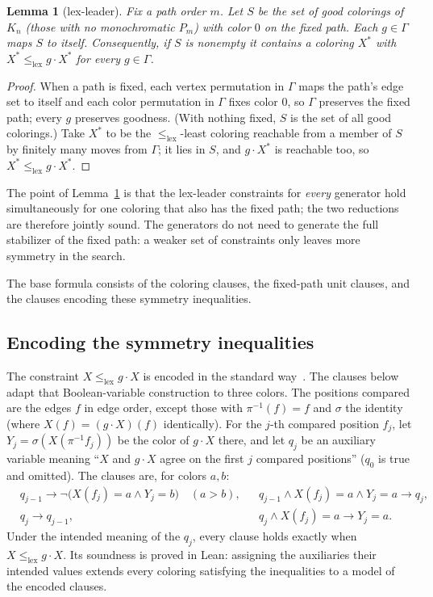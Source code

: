 \documentclass[11pt]{article}
\newtheorem{lemma}[theorem]{Lemma}
\theoremstyle{definition}
\theoremstyle{remark}
\newcommand{\lex}{\le_{\mathrm{lex}}}
\begin{document}
\begin{lemma}[lex-leader]\label{lem:lex}
Fix a path order $m$. Let $S$ be the set of good colorings of $K_n$
(those with no monochromatic $P_m$) with color $0$ on the fixed path.
Each $g\in\Gamma$ maps $S$ to itself. Consequently, if $S$ is nonempty it
contains a coloring $X^*$ with $X^*\lex g\cdot X^*$ for every
$g\in\Gamma$.
\end{lemma}

\begin{proof}
When a path is fixed, each vertex permutation in $\Gamma$ maps the
path's edge set to itself and each color permutation in $\Gamma$ fixes
color $0$, so $\Gamma$ preserves the fixed path; every $g$ preserves
goodness. (With nothing fixed, $S$ is the set of all good colorings.) Take $X^*$ to be the $\lex$-least coloring reachable from a
member of $S$ by finitely many moves from $\Gamma$; it lies in $S$, and
$g\cdot X^*$ is reachable too, so $X^*\lex g\cdot X^*$.
\end{proof}

The point of Lemma~\ref{lem:lex} is that the lex-leader constraints for
\emph{every} generator hold simultaneously for one coloring that also has
the fixed path; the two reductions are therefore jointly sound. The
generators do not need to generate the full stabilizer of the fixed path:
a weaker set of constraints only leaves more symmetry in the search.

The base formula consists of the coloring clauses, the fixed-path unit
clauses, and the clauses encoding these symmetry inequalities.
\subsection{Encoding the symmetry inequalities}\label{sec:auxiliary}
The constraint $X\lex g\cdot X$ is encoded in the standard
way~\cite[Proposition~3.1]{CGLR96}. The clauses below adapt that Boolean-variable construction to three colors. The positions compared are the edges $f$ in edge order,
except those with $\pi^{-1}(f)=f$ and $\sigma$ the identity (where
$X(f)=(g\cdot X)(f)$ identically). For the $j$-th compared position $f_j$,
let $Y_j=\sigma(X(\pi^{-1}f_j))$ be the color of $g\cdot X$ there, and let
$q_j$ be an auxiliary variable meaning ``$X$ and $g\cdot X$ agree on the
first $j$ compared positions'' ($q_0$ is true and omitted). The clauses
are, for colors $a,b$:
\begin{align*}
&q_{j-1}\to\neg\bigl(X(f_j)=a\wedge Y_j=b\bigr)\quad(a>b), &
&q_{j-1}\wedge X(f_j)=a\wedge Y_j=a\to q_j,\\
&q_j\to q_{j-1}, &
&q_j\wedge X(f_j)=a\to Y_j=a.
\end{align*}
Under the intended meaning of the $q_j$, every clause holds exactly when
$X\lex g\cdot X$.
Its soundness is proved in Lean: assigning
the auxiliaries their intended values extends every coloring satisfying
the inequalities to a model of the encoded clauses.
\end{document}
